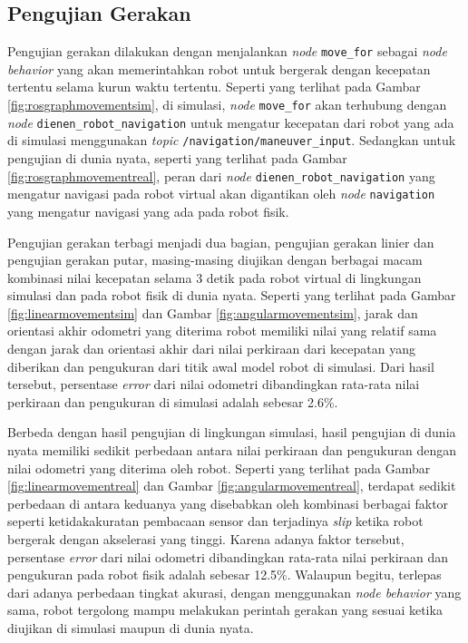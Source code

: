 \subsection{Pengujian Gerakan}
\label{subsec:movementtesting}




Pengujian gerakan dilakukan dengan menjalankan \emph{node} \lstinline{move_for} sebagai \emph{node behavior} yang akan memerintahkan robot untuk bergerak dengan kecepatan tertentu selama kurun waktu tertentu.
Seperti yang terlihat pada Gambar \ref{fig:rosgraphmovementsim},
  di simulasi,
  \emph{node} \lstinline{move_for} akan terhubung dengan \emph{node} \lstinline{dienen_robot_navigation} untuk mengatur kecepatan dari robot yang ada di simulasi menggunakan \emph{topic} \lstinline{/navigation/maneuver_input}.
Sedangkan untuk pengujian di dunia nyata, seperti yang terlihat pada Gambar \ref{fig:rosgraphmovementreal},
  peran dari \emph{node} \lstinline{dienen_robot_navigation} yang mengatur navigasi pada robot virtual akan digantikan oleh \emph{node} \lstinline{navigation} yang mengatur navigasi yang ada pada robot fisik.




Pengujian gerakan terbagi menjadi dua bagian,
  pengujian gerakan linier dan pengujian gerakan putar,
  masing-masing diujikan dengan berbagai macam kombinasi nilai kecepatan selama 3 detik pada robot virtual di lingkungan simulasi dan pada robot fisik di dunia nyata.
Seperti yang terlihat pada Gambar \ref{fig:linearmovementsim} dan Gambar \ref{fig:angularmovementsim},
  jarak dan orientasi akhir odometri yang diterima robot memiliki nilai yang relatif sama dengan jarak dan orientasi akhir dari nilai perkiraan dari kecepatan yang diberikan dan pengukuran dari titik awal model robot di simulasi.
Dari hasil tersebut, persentase \emph{error} dari nilai odometri dibandingkan rata-rata nilai perkiraan dan pengukuran di simulasi adalah sebesar 2.6\%.




Berbeda dengan hasil pengujian di lingkungan simulasi,
  hasil pengujian di dunia nyata memiliki sedikit perbedaan antara nilai perkiraan dan pengukuran dengan nilai odometri yang diterima oleh robot.
Seperti yang terlihat pada Gambar \ref{fig:linearmovementreal} dan Gambar \ref{fig:angularmovementreal},
  terdapat sedikit perbedaan di antara keduanya yang disebabkan oleh kombinasi berbagai faktor seperti ketidakakuratan pembacaan sensor dan terjadinya \emph{slip} ketika robot bergerak dengan akselerasi yang tinggi.
Karena adanya faktor tersebut,
  persentase \emph{error} dari nilai odometri dibandingkan rata-rata nilai perkiraan dan pengukuran pada robot fisik adalah sebesar 12.5\%.
Walaupun begitu,
  terlepas dari adanya perbedaan tingkat akurasi,
  dengan menggunakan \emph{node behavior} yang sama,
  robot tergolong mampu melakukan perintah gerakan yang sesuai ketika diujikan di simulasi maupun di dunia nyata.
